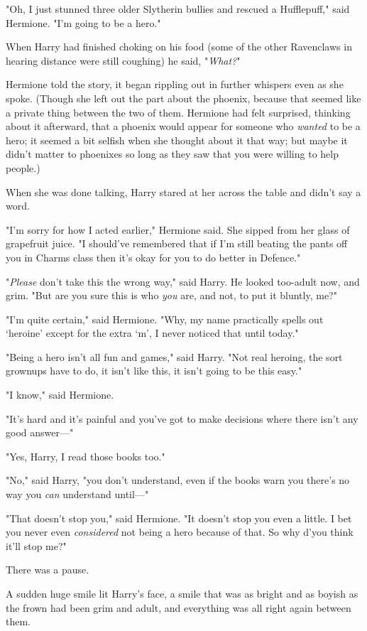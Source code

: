 "Oh, I just stunned three older Slytherin bullies and rescued a Hufflepuff,"
said Hermione. "I'm going to be a hero."

When Harry had finished choking on his food (some of the other Ravenclaws in
hearing distance were still coughing) he said, "\emph{What?}"

Hermione told the story, it began rippling out in further whispers even as she
spoke. (Though she left out the part about the phoenix, because that seemed
like a private thing between the two of them. Hermione had felt surprised,
thinking about it afterward, that a phoenix would appear for someone who
\emph{wanted} to be a hero; it seemed a bit selfish when she thought about it
that way; but maybe it didn't matter to phoenixes so long as they saw that you
were willing to help people.)

When she was done talking, Harry stared at her across the table and didn't say
a word.

"I'm sorry for how I acted earlier," Hermione said. She sipped from her glass
of grapefruit juice. "I should've remembered that if I'm still beating the
pants off you in Charms class then it's okay for you to do better in Defence."

"\emph{Please} don't take this the wrong way," said Harry. He looked too-adult
now, and grim. "But are you sure this is who \emph{you} are, and not, to put it
bluntly, me?"

"I'm quite certain," said Hermione. "Why, my name practically spells out
`heroine' except for the extra `m', I never noticed that until today."

"Being a hero isn't all fun and games," said Harry. "Not real heroing, the sort
grownups have to do, it isn't like this, it isn't going to be this easy."

"I know," said Hermione.

"It's hard and it's painful and you've got to make decisions where there isn't
any good answer---"

"Yes, Harry, I read those books too."

"No," said Harry, "you don't understand, even if the books warn you there's no
way you \emph{can} understand until---"

"That doesn't stop you," said Hermione. "It doesn't stop you even a little. I
bet you never even \emph{considered} not being a hero because of that. So why
d'you think it'll stop me?"

There was a pause.

A sudden huge smile lit Harry's face, a smile that was as bright and as boyish
as the frown had been grim and adult, and everything was all right again
between them.

